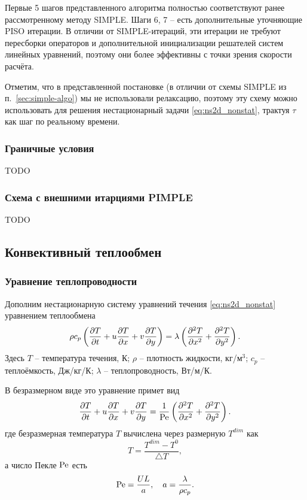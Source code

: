 Первые 5 шагов представленного алгоритма полностью соответствуют ранее рассмотренному методу SIMPLE.
Шаги 6, 7 -- есть дополнительные уточняющие PISO итерации.
В отличии от SIMPLE-итераций, эти итерации не требуют пересборки операторов и дополнительной инициализации решателей систем
линейных уравнений, поэтому они более эффективны с точки зрения скорости расчёта.

Отметим, что в представленной постановке (в отличии от схемы SIMPLE из п.~\ref{sec:simple-algo}) мы не использовали релаксацию, поэтому эту схему можно использовать
для решения нестационарный задачи \cref{eq:ns2d_nonstat}, трактуя $\tau$ как шаг по реальному времени.

\subsubsection{Граничные условия}
TODO

\subsubsection{Схема с внешними итарциями PIMPLE}
TODO

\subsection{Конвективный теплообмен}
\subsubsection{Уравнение теплопроводности}

Дополним нестационарную систему уравнений течения \cref{eq:ns2d_nonstat} уравнением теплообмена
\begin{equation*}
\rho c_p\left(\frac{\partial T}{\partial t} + u\frac{\partial T}{\partial x} + v\frac{\partial T}{\partial y}\right) = \lambda\left(\frac{\partial^2 T}{\partial x^2} + \frac{\partial^2 T}{\partial y^2}\right).
\end{equation*}
Здесь $T$ -- температура течения, К; $\rho$ -- плотность жидкости, кг/м$^3$; $c_p$ -- теплоёмкость, Дж/кг/К;
$\lambda$ -- теплопроводность, Вт/м/К.

В безразмерном виде это уравнение примет вид
\begin{equation}
\label{eq:ns2d_nonstat_temperature}
\frac{\partial T}{\partial t} + u\frac{\partial T}{\partial x} + v\frac{\partial T}{\partial y} = \frac{1}{\mathrm{Pe}}\left(\frac{\partial^2 T}{\partial x^2} + \frac{\partial^2 T}{\partial y^2}\right).
\end{equation}
где безразмерная температура $T$ вычислена через размерную $T^{dim}$ как 
$$
T = \frac{T^{dim} - T^0}{\triangle T},
$$
а число Пекле $\mathrm{Pe}$ есть
$$
\mathrm{Pe} = \frac{U L}{a}, \quad a = \frac{\lambda}{\rho c_p}.
$$

